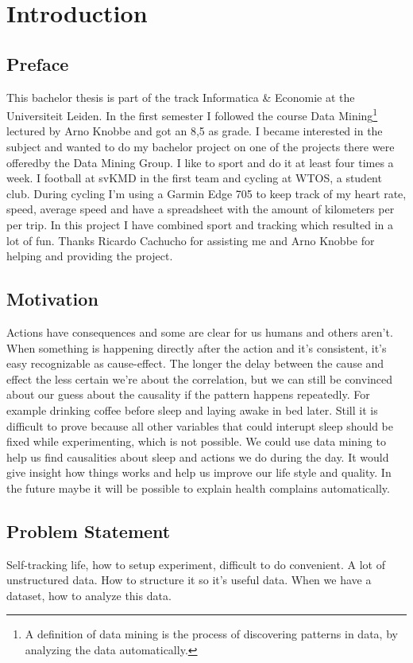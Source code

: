 \section{Introduction}
	\subsection{Preface}
		This bachelor thesis is part of the track Informatica \& Economie at the Universiteit Leiden. In the first semester I followed the course Data Mining\footnote{A definition of data mining is the process of discovering patterns in data, by analyzing the data automatically\cite{datamining}.} lectured by Arno Knobbe and got an 8,5 as grade. I became interested in the subject and wanted to do my bachelor project on one of the projects there were offeredby the Data Mining Group. I like to sport and do it at least four times a week. I football at svKMD in the first team and cycling at WTOS, a student club. During cycling I'm using a Garmin Edge 705 to keep track of my heart rate, speed, average speed and have a spreadsheet with the amount of kilometers per per trip. In this project I have combined sport and tracking which resulted in a lot of fun. Thanks Ricardo Cachucho for assisting me and Arno Knobbe for helping and providing the project.

	\subsection{Motivation}
		Actions have consequences and some are clear for us humans and others aren't. When something is happening directly after the action and it's consistent, it's easy recognizable as cause-effect. The longer the delay between the cause and effect the less certain we're about the correlation, but we can still be convinced about our guess about the causality if the pattern happens repeatedly. For example drinking coffee before sleep and laying awake in bed later. Still it is difficult to prove because all other variables that could interupt sleep should be fixed while experimenting, which is not possible. We could use data mining to help us find causalities about sleep and actions we do during the day. It would give insight how things works and help us improve our life style and quality. In the future maybe it will be possible to explain health complains automatically.

	\subsection{Problem Statement}
		Self-tracking life, how to setup experiment, difficult to do convenient. A lot of unstructured data. How to structure it so it's useful data. 
		When we have a dataset, how to analyze this data. 

